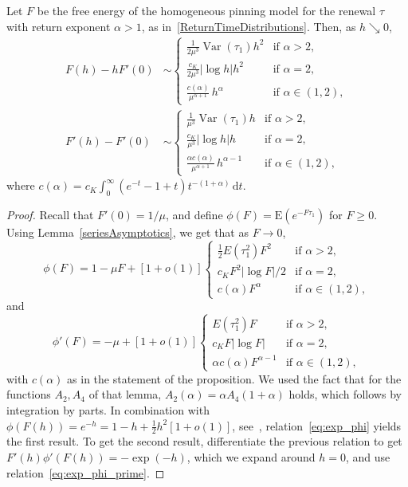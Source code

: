 \documentclass[AHL,Unicode,longabstracts]{cedram}
\DeclareMathOperator{\var}{\ensuremath{\PEfont Var}}
\newcommand{\ga}{\alpha}
\newcommand{\dd}{\mathrm{d}}
\newcommand{\PEfont}{\mathrm}
\newcommand\bE{\ensuremath{\mathrm{E}}}
\begin{document}
\begin{prop}\label{pr:asympt.hom.free.energy}
Let $F$ be the free energy of the homogeneous pinning model for the renewal $\tau$ with return exponent $\ga > 1$, as in~\eqref{ReturnTimeDistributions}. Then, as $h \searrow 0$,
\begin{equation}\label{eq:asymptoticsFh}
\begin{aligned}
F(h) - h F'(0) &\sim
\begin{cases}
\frac{1}{2 \mu^3} \var(\tau_1) h^2 & \text{if } \ga > 2,\\
\frac{c_K}{2 \mu^3} |\log h| h^2 & \text{if } \ga = 2,\\
\frac{c(\ga)}{\mu^{\ga + 1}} \, h^{\ga} & \text{if } \ga \in (1,2),
\end{cases}\\
F'(h) - F'(0) &\sim
\begin{cases}
\frac{1}{\mu^3} \var(\tau_1) h & \text{if } \ga > 2,\\
\frac{c_K}{\mu^3} |\log h| h & \text{if } \ga = 2,\\
\frac{\ga c(\ga)}{\mu^{\ga + 1}} \, h^{\ga - 1} & \text{if } \ga \in(1,2),
\end{cases}
\end{aligned}
\end{equation}
where $c(\ga) = c_K \int_0^\infty (e^{- t} - 1 + t) t^{- (1 + \ga)} \, \dd t$.
\end{prop}

\begin{proof}
Recall that $F'(0) = 1/\mu$, and define $\phi(F) = \bE(e^{- F \tau_1})$ for $F\geq 0$. Using Lemma~\ref{seriesAsymptotics}, we get that as $F\to 0$,
\begin{equation}\label{eq:exp_phi}
\phi(F) = 1 - \mu F + [1 + o(1)]
\begin{cases}
\frac{1}{2} E(\tau_1^2) F^2 & \text{if } \ga > 2,\\
c_K F^2|\log F|/2 & \text{if } \ga =2,\\
c(\ga) F^\ga & \text{if } \ga \in (1,2),
\end{cases}
\end{equation}
and
\begin{equation}\label{eq:exp_phi_prime}
\phi'(F) = - \mu + [1 + o(1)]
\begin{cases}
E(\tau_1^2) F & \text{if } \ga > 2,\\
c_K F |\log F| & \text{if } \ga =2,\\
\ga c(\ga) F^{\ga-1} & \text{if } \ga \in (1,2),
\end{cases}
\end{equation}
with $c(\ga)$ as in the statement of the proposition. We used the fact that for the functions $A_2, A_4$ of that lemma, $A_2(\ga)=\ga A_4(1+\ga)$ holds, which follows by integration by parts. In combination with $\phi(F(h)) = e^{- h} = 1 - h + \frac{1}{2} h^2 [1 + o(1)]$, see~\cite[Section~2.1, Equation (2.2)]{Gi2007}, relation~\eqref{eq:exp_phi} yields the first result. To get the second result, differentiate the previous relation to get $F'(h) \phi' (F(h)) = - \exp(- h)$, which we expand around $h = 0$, and use relation~\eqref{eq:exp_phi_prime}.
\end{proof}
\end{document}
